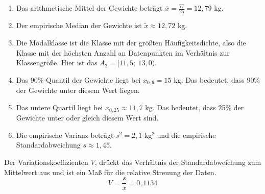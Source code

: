 \documentclass[main.tex]{subfiles}
\begin{document}
\renewcommand{\labelenumi}{\theenumi}
\renewcommand{\theenumi}{\roman{enumi}.}%
\begin{enumerate}
    \item Das arithmetische Mittel der Gewichte beträgt $\overline{x}=\frac{77}{25} = 12,79$ kg.
    \item Der empirische Median der Gewichte ist $\tilde{x}\approx 12,72$ kg.
    \item Die Modalklasse ist die Klasse mit der größten Häufigkeitsdichte, also die Klasse mit der höchsten Anzahl an Datenpunkten im Verhältnis zur Klassengröße. Hier ist das $A_2 = [11,5;\  13,0)$.
    \item Das $90\%$-Quantil der Gewichte liegt bei $x_{0,9} = 15$ kg. Das bedeutet, dass 90\% der Gewichte unter diesem Wert liegen.
    \item Das untere Quartil liegt bei $x_{0,25} \approx 11,7$ kg. Das bedeutet, dass 25\% der Gewichte unter oder gleich diesem Wert sind.
    \item Die empirische Varianz beträgt $s^2 = 2,1$ kg$^2$ und die empirische Standardabweichung $s \approx 1,45$.
\end{enumerate}

Der Variationskoeffizienten $V$, drückt das Verhältnis der Standardabweichung zum Mittelwert aus und ist ein Maß für die relative Streuung der Daten.
$$
    V = \frac{s}{\overline{x}} = 0,1134
$$
\end{document}
